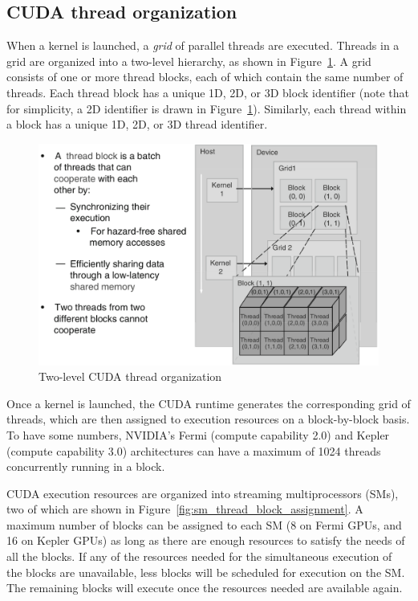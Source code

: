 \documentclass[10pt, a4paper]{report}
\begin{document}
\subsection{CUDA thread organization}
When a kernel is launched, a \emph{grid} of parallel threads are executed.
Threads in a grid are organized into a two-level hierarchy, as shown in
Figure~\ref{fig:cuda_thread_organization}.
A grid consists of one or more thread blocks, each of which contain the same
number of threads.
Each thread block has a unique 1D, 2D, or 3D block identifier (note that for
simplicity, a 2D identifier is drawn in
Figure~\ref{fig:cuda_thread_organization}).
Similarly, each thread within a block has a unique 1D, 2D, or 3D thread
identifier.

\begin{figure}[h]
\centering
\includegraphics[scale=0.27]{figs/cuda_thread_organization}
\caption{Two-level CUDA thread organization}
\label{fig:cuda_thread_organization}
\end{figure}

Once a kernel is launched, the CUDA runtime generates the corresponding grid of
threads, which are then assigned to execution resources on a block-by-block
basis.
To have some numbers, NVIDIA's Fermi (compute capability 2.0) and Kepler
(compute capability 3.0) architectures can have a maximum of 1024 threads
concurrently running in a block.

CUDA execution resources are organized into streaming multiprocessors (SMs), two
of which are shown in Figure~\ref{fig:sm_thread_block_assignment}.
A maximum number of blocks can be assigned to each SM (8 on Fermi GPUs, and 16
on Kepler GPUs) as long as there are enough resources to satisfy the needs of
all the blocks.
If any of the resources needed for the simultaneous execution of the blocks are
unavailable, less blocks will be scheduled for execution on the SM.
The remaining blocks will execute once the resources needed are available again.
\end{document}

